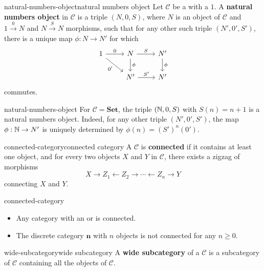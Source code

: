 \begin{topic}{natural-numbers-object}{natural numbers object}
    Let $\mathcal{C}$ be a  with a  $1$. A \textbf{natural numbers object} in $\mathcal{C}$ is a triple $(N, 0, S)$, where $N$ is an object of $\mathcal{C}$ and $1 \xrightarrow{0} N$ and $N \xrightarrow{S} N$ morphisms, such that for any other such triple $(N', 0', S')$, there is a unique map $\phi : N \to N'$ for which
    \[ \begin{tikzcd} 1 \arrow{r}{0} \arrow[swap]{rd}{0'} & N \arrow{d}{\phi} \arrow{r}{S} & N' \arrow{d}{\phi} \\ & N' \arrow{r}{S'} & N' \end{tikzcd} \]
    commutes.
\end{topic}

\begin{example}{natural-numbers-object}
    For $\mathcal{C} = \textbf{Set}$, the triple $(\mathbb{N}, 0, S)$ with $S(n) = n + 1$ is a natural numbers object. Indeed, for any other triple $(N', 0', S')$, the map $\phi : \mathbb{N} \to N'$ is uniquely determined by $\phi(n) = (S')^n(0')$.
\end{example}

\begin{topic}{connected-category}{connected category}
    A  $\mathcal{C}$ is \textbf{connected} if it contains at least one object, and for every two objects $X$ and $Y$ in $\mathcal{C}$, there exists a zigzag of morphisms
    \[ X \rightarrow Z_1 \leftarrow Z_2 \rightarrow \cdots \leftarrow Z_n \rightarrow Y \]
    connecting $X$ and $Y$.
\end{topic}

\begin{example}{connected-category}
    \begin{itemize}
        \item Any category with an  or  is connected.
        \item The discrete category $\textbf{n}$ with $n$ objects is not connected for any $n \ge 0$.
    \end{itemize}
\end{example}

\begin{topic}{wide-subcategory}{wide subcategory}
    A \textbf{wide subcategory} of a  $\mathcal{C}$ is a subcategory of $\mathcal{C}$ containing all the objects of $\mathcal{C}$.
\end{topic}


